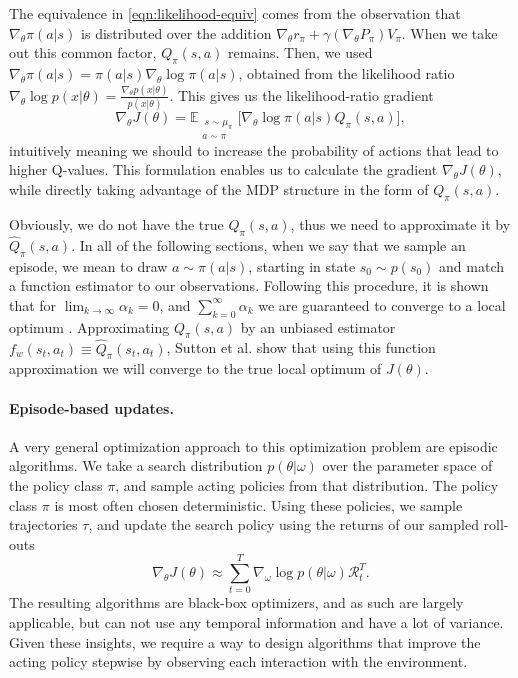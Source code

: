 The equivalence in \eqref{eqn:likelihood-equiv} comes from the observation that $\nabla_\theta \pi(a|s)$ is distributed over the addition $\nabla_\theta r_\pi + \gamma (\nabla_\theta P_\pi) V_\pi$.
When we take out this common factor, $Q_\pi(s,a)$ remains.
Then, we used $\nabla_\theta \pi(a|s) = \pi(a|s)\nabla_\theta\log\pi(a|s)$, obtained from the likelihood ratio $\nabla_\theta \log p(x|\theta) = \frac{\nabla_\theta p(x|\theta)}{p(x|\theta)}$. 
This gives us the likelihood-ratio gradient
\begin{equation}
	\nabla_\theta J(\theta) = \mathbb{E}_{\substack{\ s \sim \mu_\pi \\a \sim \pi}} \Big[\nabla_\theta{\log\pi(a|s)}Q_\pi(s,a)\Big],
	\label{eqn:like-grad}
\end{equation}
intuitively meaning we should to increase the probability of actions that lead to higher Q-values.
This formulation enables us to calculate the gradient $\nabla_\theta J(\theta)$, while directly taking advantage of the MDP structure in the form of $Q_\pi(s,a)$.

Obviously, we do not have the true $Q_\pi(s,a)$, thus we need to approximate it by $\hat{Q}_\pi(s,a)$. 
In all of the following sections, when we say that we sample an episode, we mean to draw $a \sim \pi(a|s)$, starting in state $s_0 \sim p(s_0)$ and match a function estimator to our observations.
Following this procedure, it is shown that for $\lim_{k\to\infty}\alpha_k = 0$, and $\sum_{k=0}^\infty \alpha_k$ we are guaranteed to converge to a local optimum \cite{Sutton:1999:PGM:3009657.3009806}.
Approximating $Q_\pi(s,a)$ by an unbiased estimator $f_w(s_t, a_t) \equiv \hat{Q}_\pi(s_t, a_t)$, Sutton et al. \cite{Sutton:1999:PGM:3009657.3009806} show that using this function approximation we will converge to the true local optimum of $J(\theta)$.

\paragraph{Episode-based updates.} 
A very general optimization approach to this optimization problem are episodic algorithms. 
We take a search distribution $p(\theta|\omega)$ over the parameter space of the policy class $\pi$, and sample acting policies from that distribution. 
The policy class $\pi$ is most often chosen deterministic. 
Using these policies, we sample trajectories $\tau$, and update the search policy using the returns of our sampled roll-outs
\begin{equation}
	\nabla_\theta J(\theta) \approx \sum_{t=0}^T \nabla_\omega \log p(\theta|\omega) \mathcal{R}_t^T.
\end{equation}
The resulting algorithms are black-box optimizers, and as such are largely applicable, but can not use any temporal information and have a lot of variance.
Given these insights, we require a way to design algorithms that improve the acting policy stepwise by observing each interaction with the environment.

